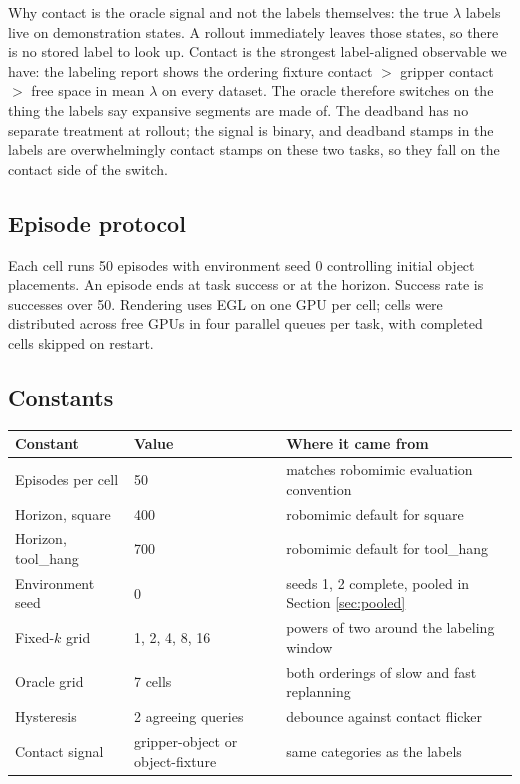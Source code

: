 \documentclass[11pt]{article}
\begin{document}
Why contact is the oracle signal and not the labels themselves: the true
$\lambda$ labels live on demonstration states. A rollout immediately leaves those
states, so there is no stored label to look up. Contact is the strongest
label-aligned observable we have: the labeling report shows the ordering
fixture contact $>$ gripper contact $>$ free space in mean $\lambda$ on every
dataset. The oracle therefore switches on the thing the labels say expansive
segments are made of. The deadband has no separate treatment at rollout; the
signal is binary, and deadband stamps in the labels are overwhelmingly contact
stamps on these two tasks, so they fall on the contact side of the switch.

\subsection{Episode protocol}

Each cell runs 50 episodes with environment seed 0 controlling initial object
placements. An episode ends at task success or at the horizon. Success rate is
successes over 50. Rendering uses EGL on one GPU per cell; cells were distributed
across free GPUs in four parallel queues per task, with completed cells skipped on
restart.

\subsection{Constants}

\begin{center}
\small
\begin{tabular}{@{}lll@{}}
\toprule
Constant & Value & Where it came from \\
\midrule
Episodes per cell & 50 & matches robomimic evaluation convention \\
Horizon, square & 400 & robomimic default for square \\
Horizon, tool\_hang & 700 & robomimic default for tool\_hang \\
Environment seed & 0 & seeds 1, 2 complete, pooled in Section \ref{sec:pooled} \\
Fixed-$k$ grid & 1, 2, 4, 8, 16 & powers of two around the labeling window \\
Oracle grid & 7 cells & both orderings of slow and fast replanning \\
Hysteresis & 2 agreeing queries & debounce against contact flicker \\
Contact signal & gripper-object or object-fixture & same categories as the labels \\
\bottomrule
\end{tabular}
\end{center}
\end{document}

